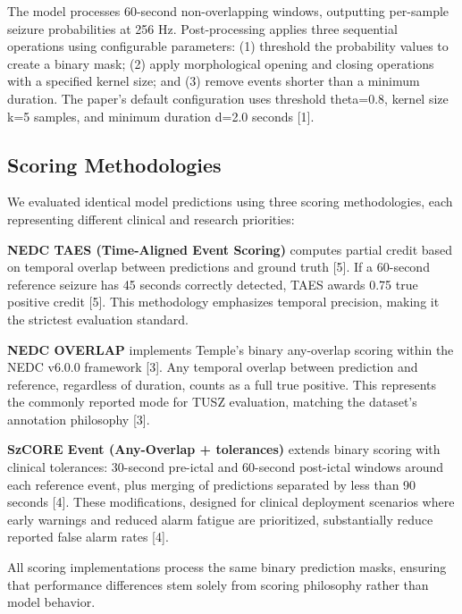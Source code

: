 \documentclass[
]{article}
\begin{document}
The model processes 60-second non-overlapping windows, outputting
per-sample seizure probabilities at 256 Hz. Post-processing applies
three sequential operations using configurable parameters: (1) threshold
the probability values to create a binary mask; (2) apply morphological
opening and closing operations with a specified kernel size; and (3)
remove events shorter than a minimum duration. The paper's default
configuration uses threshold theta=0.8, kernel size k=5 samples, and
minimum duration d=2.0 seconds {[}1{]}.

\hypertarget{scoring-methodologies}{%
\subsection{Scoring Methodologies}\label{scoring-methodologies}}

We evaluated identical model predictions using three scoring
methodologies, each representing different clinical and research
priorities:

\textbf{NEDC TAES (Time-Aligned Event Scoring)} computes partial credit
based on temporal overlap between predictions and ground truth {[}5{]}.
If a 60-second reference seizure has 45 seconds correctly detected, TAES
awards 0.75 true positive credit {[}5{]}. This methodology emphasizes
temporal precision, making it the strictest evaluation standard.

\textbf{NEDC OVERLAP} implements Temple's binary any-overlap scoring
within the NEDC v6.0.0 framework {[}3{]}. Any temporal overlap between
prediction and reference, regardless of duration, counts as a full true
positive. This represents the commonly reported mode for TUSZ
evaluation, matching the dataset's annotation philosophy {[}3{]}.

\textbf{SzCORE Event (Any-Overlap + tolerances)} extends binary scoring
with clinical tolerances: 30-second pre-ictal and 60-second post-ictal
windows around each reference event, plus merging of predictions
separated by less than 90 seconds {[}4{]}. These modifications, designed
for clinical deployment scenarios where early warnings and reduced alarm
fatigue are prioritized, substantially reduce reported false alarm rates
{[}4{]}.

All scoring implementations process the same binary prediction masks,
ensuring that performance differences stem solely from scoring
philosophy rather than model behavior.
\end{document}

